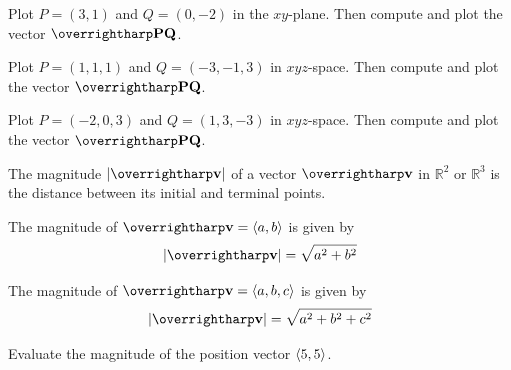 \documentclass[letterpaper, twoside, 12pt]{book}
\begin{document}
          \begin{solution}

          \end{solution}

          \begin{problem}
            Plot $P=(3,1)$ and $Q=(0,-2)$ in the $xy$-plane.
            Then compute and plot the vector $\harpvec{PQ}$.
          \end{problem}

          \begin{solution}

          \end{solution}

          \begin{problem}
            Plot $P=(1,1,1)$ and $Q=(-3,-1,3)$ in $xyz$-space.
            Then compute and plot the vector $\harpvec{PQ}$.
          \end{problem}

          \begin{solution}

          \end{solution}

          \begin{problem}
            Plot $P=(-2,0,3)$ and $Q=(1,3,-3)$ in $xyz$-space.
            Then compute and plot the vector $\harpvec{PQ}$.
          \end{problem}

          \begin{solution}

          \end{solution}



\begin{definition}
  The magnitude $|\harpvec{v}|$ of a vector $\harpvec{v}$ in $\mathbb{R}^2$ or
  $\mathbb{R}^3$ is the distance between its initial and terminal points.
\end{definition}

\begin{theorem}
  The magnitude of $\harpvec{v}=\<a,b\>$ is given by
    \[|\harpvec{v}|=\sqrt{a^2+b^2}\]

  The magnitude of $\harpvec{v}=\<a,b,c\>$ is given by
    \[|\harpvec{v}|=\sqrt{a^2+b^2+c^2}\]
\end{theorem}



          \begin{problem}
            Evaluate the magnitude of the position vector $\langle5,5\rangle$.
          \end{problem}
\end{document}
